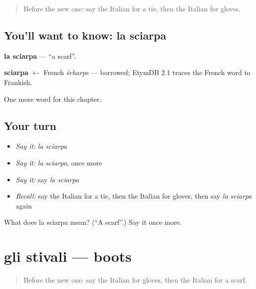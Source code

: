 \label{lesson:IT-C103-sciarpa}



\begin{quote}
Before the new one: say the Italian for a tie, then the Italian for gloves.
\end{quote}

\subsection*{You'll want to know: la sciarpa}
\textbf{la sciarpa} — \textquotedblleft{}a scarf\textquotedblright{}.

\begin{cousinweb}
\textbf{sciarpa} $\leftarrow$ French \emph{écharpe} — borrowed; EtymDB 2.1 traces the French word to Frankish.
\end{cousinweb}

\begin{grammarlens}[title={What you've built}]
One more word for this chapter.
\end{grammarlens}

\subsection*{Your turn}
\begin{itemize}
\raggedright
  \item \emph{Say it:} \emph{la sciarpa}
  \item \emph{Say it:} \emph{la sciarpa}, once more
  \item \emph{Say it:} say \emph{la sciarpa}
  \item \emph{Recall:} say the Italian for a tie, then the Italian for gloves, then say \emph{la sciarpa} again
\end{itemize}

\begin{tcolorbox}[breakable,colback=teal!4,colframe=teal!35!black,title={Before you move on}]
What does la sciarpa mean? (\textquotedblleft{}A scarf\textquotedblright{}.) Say it once more.
\end{tcolorbox}
\section[gli stivali]{gli stivali — boots}

\label{lesson:IT-C103-stivali}



\begin{quote}
Before the new one: say the Italian for gloves, then the Italian for a scarf.
\end{quote}

